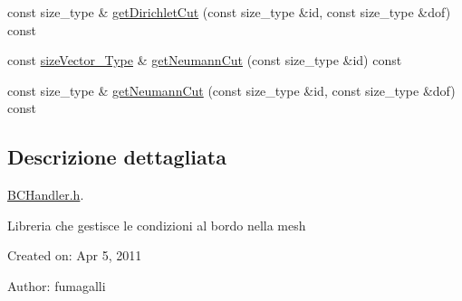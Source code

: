 \begin{DoxyCompactItemize}
\item 
const size\-\_\-type \& \hyperlink{classBCHandler_a390cb50c5fcbbf2e676fe7d5f5241180}{get\-Dirichlet\-Cut} (const size\-\_\-type \&id, const size\-\_\-type \&dof) const 
\item 
const \hyperlink{Core_8h_a83c51913d041a5001e8683434c09857f}{size\-Vector\-\_\-\-Type} \& \hyperlink{classBCHandler_a5e71b2adeaa281e88275bff504dc67d8}{get\-Neumann\-Cut} (const size\-\_\-type \&id) const 
\item 
const size\-\_\-type \& \hyperlink{classBCHandler_a726f1bfbc76113bbb3b5057b25a53871}{get\-Neumann\-Cut} (const size\-\_\-type \&id, const size\-\_\-type \&dof) const 
\end{DoxyCompactItemize}


\subsection{Descrizione dettagliata}
\hyperlink{BCHandler_8h}{B\-C\-Handler.\-h}. 

Libreria che gestisce le condizioni al bordo nella mesh

Created on\-: Apr 5, 2011

Author\-: fumagalli 

